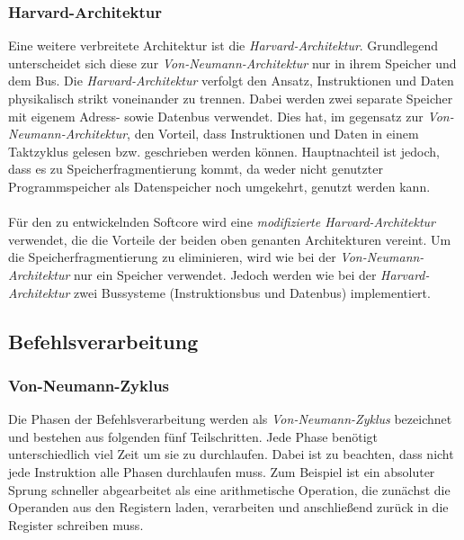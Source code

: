                 \subsubsection{Harvard-Architektur}\label{lab:havard}
                    Eine weitere verbreitete Architektur ist die \textit{Harvard-Architektur}.
                    Grundlegend unterscheidet sich diese zur \textit{Von-Neumann-Architektur}
                    nur in ihrem Speicher und dem Bus. Die \textit{Harvard-Architektur} verfolgt den Ansatz,
                    Instruktionen und Daten physikalisch strikt voneinander zu trennen.
                    Dabei werden zwei separate Speicher mit eigenem Adress- sowie Datenbus verwendet.
                    Dies hat, im gegensatz zur \textit{Von-Neumann-Architektur}, den Vorteil, dass Instruktionen
                    und Daten in einem Taktzyklus gelesen bzw. geschrieben werden können. Hauptnachteil ist jedoch,
                    dass es zu Speicherfragmentierung kommt, da weder nicht genutzter Programmspeicher als Datenspeicher
                    noch umgekehrt, genutzt werden kann.
                    \\\\
                    Für den zu entwickelnden Softcore wird eine \textit{modifizierte Harvard-Architektur} verwendet, die
                    die Vorteile der beiden oben genanten Architekturen vereint. Um die Speicherfragmentierung zu eliminieren, 
                    wird wie bei der \textit{Von-Neumann-Architektur} nur ein Speicher verwendet.
                    Jedoch werden wie bei der \textit{Harvard-Architektur} zwei Bussysteme (Instruktionsbus und Datenbus)
                    implementiert. 

        \subsection{Befehlsverarbeitung}

            \subsubsection{Von-Neumann-Zyklus}
                Die Phasen der Befehlsverarbeitung werden als \textit{Von-Neumann-Zyklus}
                bezeichnet und bestehen aus folgenden fünf Teilschritten.
                Jede Phase benötigt unterschiedlich viel Zeit um sie zu durchlaufen.
                Dabei ist zu beachten, dass nicht jede Instruktion alle Phasen durchlaufen muss.
                Zum Beispiel ist ein absoluter Sprung schneller abgearbeitet als eine arithmetische
                Operation, die zunächst die Operanden aus den Registern laden,
                verarbeiten und anschließend zurück in die Register schreiben muss.
            
